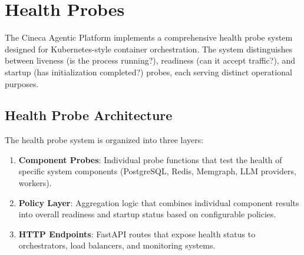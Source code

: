 
\section{Health Probes}
\label{sec:health-probes}

The Cineca Agentic Platform implements a comprehensive health probe system designed for Kubernetes-style container orchestration. The system distinguishes between liveness (is the process running?), readiness (can it accept traffic?), and startup (has initialization completed?) probes, each serving distinct operational purposes.

\subsection{Health Probe Architecture}

The health probe system is organized into three layers:

\begin{enumerate}
    \item \textbf{Component Probes}: Individual probe functions that test the health of specific system components (PostgreSQL, Redis, Memgraph, LLM providers, workers).
    
    \item \textbf{Policy Layer}: Aggregation logic that combines individual component results into overall readiness and startup status based on configurable policies.
    
    \item \textbf{HTTP Endpoints}: FastAPI routes that expose health status to orchestrators, load balancers, and monitoring systems.
\end{enumerate}

